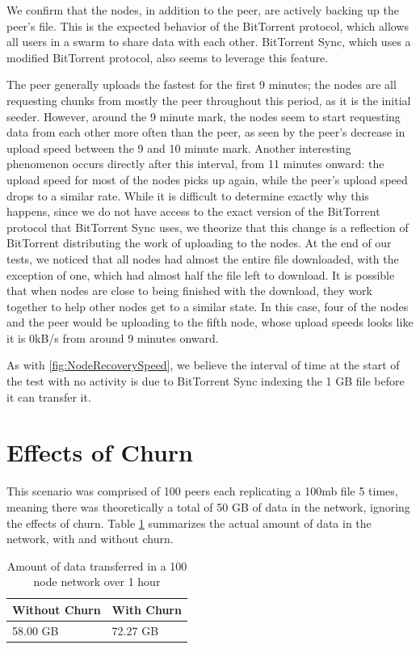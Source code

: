 \documentclass[12pt]{report}
\begin{document}
We confirm that the nodes, in addition to the peer, are actively backing up the peer's file. This is the expected behavior of the BitTorrent protocol, which allows all users in a swarm to share data with each other. BitTorrent Sync, which uses a modified BitTorrent protocol, also seems to leverage this feature.

The peer generally uploads the fastest for the first 9 minutes; the nodes are all requesting chunks from mostly the peer throughout this period, as it is the initial seeder. However, around the 9 minute mark, the nodes seem to start requesting data from each other more often than the peer, as seen by the peer's decrease in upload speed between the 9 and 10 minute mark. Another interesting phenomenon occurs directly after this interval, from 11 minutes onward: the upload speed for most of the nodes picks up again, while the peer's upload speed drops to a similar rate. While it is difficult to determine exactly why this happens, since we do not have access to the exact version of the BitTorrent protocol that BitTorrent Sync uses, we theorize that this change is a reflection of BitTorrent distributing the work of uploading to the nodes. At the end of our tests, we noticed that all nodes had almost the entire file downloaded, with the exception of one, which had almost half the file left to download. It is possible that when nodes are close to being finished with the download, they work together to help other nodes get to a similar state. In this case, four of the nodes and the peer would be uploading to the fifth node, whose upload speeds looks like it is 0kB/s from around 9 minutes onward.

As with \ref{fig:NodeRecoverySpeed}, we believe the interval of time at the start of the test with no activity is due to BitTorrent Sync indexing the 1 GB file before it can transfer it.

\section{Effects of Churn} \label{sec:EffectsofChurn}

This scenario was comprised of 100 peers each replicating a 100mb file 5 times, meaning there was theoretically a total of 50 GB of data in the network, ignoring the effects of churn. Table \ref{tab:ChurnBandwidth} summarizes the actual amount of data in the network, with and without churn.

\begin{table}
\begin{center}
    \begin{tabular}{| l | l |}
    \hline
    Without Churn & With Churn \\ \hline
    58.00 GB & 72.27 GB\\ \hline
    \end{tabular}
    \caption{Amount of data transferred in a 100 node network over 1 hour}
    \label{tab:ChurnBandwidth}
\end{center}
\end{table}
\end{document}
